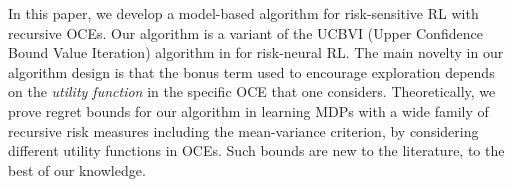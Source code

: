\documentclass[11pt]{article}
\newcommand{\1}{\mathbbm{1}}
\begin{document}




In this paper, we develop a model-based algorithm for risk-sensitive RL with recursive OCEs. Our algorithm is a  variant of the UCBVI (Upper Confidence Bound Value Iteration) algorithm in \cite{azar2017minimax} for risk-neural RL. The main novelty in our algorithm design is that the bonus term used to encourage exploration depends on the \textit{utility function} in the specific OCE that one considers. 
Theoretically, we prove regret bounds for our algorithm in learning MDPs with a wide family of recursive risk measures including the mean-variance criterion, by considering different utility functions in OCEs. Such bounds are new to the literature, to the best of our knowledge. 





\end{document}
